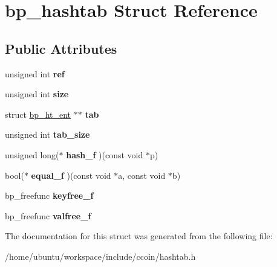 \hypertarget{structbp__hashtab}{\section{bp\-\_\-hashtab Struct Reference}
\label{structbp__hashtab}
}
\subsection*{Public Attributes}
\begin{DoxyCompactItemize}
\item 
\hypertarget{structbp__hashtab_aef45c690ee33d45a0714bfe5dac264a6}{unsigned int {\bfseries ref}}\label{structbp__hashtab_aef45c690ee33d45a0714bfe5dac264a6}

\item 
\hypertarget{structbp__hashtab_a1e2fb3d5cd0a971e7f7b1ff41acef649}{unsigned int {\bfseries size}}\label{structbp__hashtab_a1e2fb3d5cd0a971e7f7b1ff41acef649}

\item 
\hypertarget{structbp__hashtab_a903483bb2939a2006da23579129456fd}{struct \hyperlink{structbp__ht__ent}{bp\-\_\-ht\-\_\-ent} $\ast$$\ast$ {\bfseries tab}}\label{structbp__hashtab_a903483bb2939a2006da23579129456fd}

\item 
\hypertarget{structbp__hashtab_a5e2715744b8c773324bba01492450ad6}{unsigned int {\bfseries tab\-\_\-size}}\label{structbp__hashtab_a5e2715744b8c773324bba01492450ad6}

\item 
\hypertarget{structbp__hashtab_ac3e87e81004447f5c2e81a17276ca483}{unsigned long($\ast$ {\bfseries hash\-\_\-f} )(const void $\ast$p)}\label{structbp__hashtab_ac3e87e81004447f5c2e81a17276ca483}

\item 
\hypertarget{structbp__hashtab_a73a0aa22ac9b288719720c570965e6c1}{bool($\ast$ {\bfseries equal\-\_\-f} )(const void $\ast$a, const void $\ast$b)}\label{structbp__hashtab_a73a0aa22ac9b288719720c570965e6c1}

\item 
\hypertarget{structbp__hashtab_a20e92ea4e9a75f05efbd0dceb85da291}{bp\-\_\-freefunc {\bfseries keyfree\-\_\-f}}\label{structbp__hashtab_a20e92ea4e9a75f05efbd0dceb85da291}

\item 
\hypertarget{structbp__hashtab_ace867f1fa66d7a1572464dae068c4bca}{bp\-\_\-freefunc {\bfseries valfree\-\_\-f}}\label{structbp__hashtab_ace867f1fa66d7a1572464dae068c4bca}

\end{DoxyCompactItemize}


The documentation for this struct was generated from the following file\-:\begin{DoxyCompactItemize}
\item 
/home/ubuntu/workspace/include/ccoin/hashtab.\-h\end{DoxyCompactItemize}
